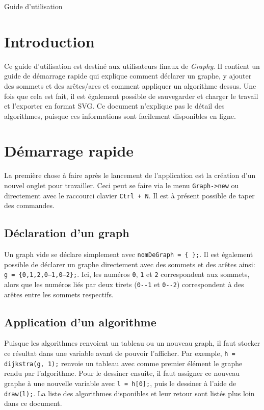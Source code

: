 \documentclass[french]{article}
\begin{document}
	\centering
	\huge
	
	Guide d'utilisation
	
	\justifying
	\normalsize
	
	\section{Introduction}
	Ce guide d'utilisation est destiné aux utilisateurs finaux de \textit{Graphy}. Il contient un guide de démarrage rapide qui explique comment déclarer un graphe, y ajouter des sommets et des arêtes/arcs et comment appliquer un algorithme dessus. Une fois que cela est fait, il est également possible de sauvegarder et charger le travail et l'exporter en format SVG. Ce document n'explique pas le détail des algorithmes, puisque ces informations sont facilement disponibles en ligne.
	
	\section{Démarrage rapide}
	La première chose à faire après le lancement de l'application est la création d'un nouvel onglet pour travailler. Ceci peut se faire via le menu \texttt{Graph->new} ou directement avec le raccourci clavier \texttt{Ctrl + N}. Il est à présent possible de taper des commandes.
	
		\subsection{Déclaration d'un graph}
		Un graph vide se déclare simplement avec \texttt{nomDeGraph = \{ \};}. Il est également possible de déclarer un graphe directement avec des sommets et des arêtes ainsi: \texttt{g = \{0,1,2,0--1,0--2\};}. Ici, les numéros \texttt{0}, \texttt{1} et \texttt{2} correspondent aux sommets, alors que les numéros liés par deux tirets (\texttt{0-{}-1} et \texttt{0-{}-2}) correspondent à des arêtes entre les sommets respectifs.
		
		\subsection{Application d'un algorithme}
		Puisque les algorithmes renvoient un tableau ou un nouveau graph, il faut stocker ce résultat dans une variable avant de pouvoir l'afficher. Par exemple, \texttt{h = dijkstra(g, 1);} renvoie un tableau avec comme premier élément le graphe rendu par l'algorithme. Pour le dessiner ensuite, il faut assigner ce nouveau graphe à une nouvelle variable avec \texttt{l = h[0];}, puis le dessiner à l'aide de \texttt{draw(l);}. La liste des algorithmes disponibles et leur retour sont listés plus loin dans ce document.
	
\end{document}
